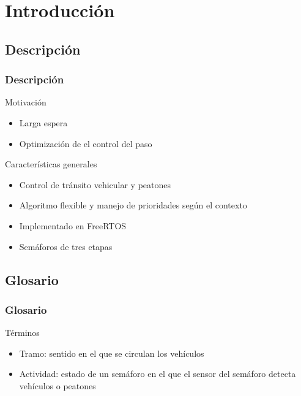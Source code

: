 \section{Introducción} 

\subsection{Descripción}

\begin{frame}
	\frametitle{Descripción}
		\begin{block}{Motivación}
			\begin{itemize}
				\item Larga espera
				\item Optimización de el control del paso
			\end{itemize}
		\end{block}

		\begin{block}{Características generales}
			\begin{itemize}
				\item Control de tránsito vehicular y peatones
				\item Algoritmo flexible y manejo de prioridades según el contexto
				\item Implementado en FreeRTOS
				\item Semáforos de tres etapas
			\end{itemize}
		\end{block}
\end{frame}

\subsection{Glosario}

\begin{frame}
	\frametitle{Glosario}
	\begin{block}{Términos}
		\begin{itemize}
			\item Tramo: sentido en el que se circulan los vehículos
			\item Actividad: estado de un semáforo en el que el sensor del semáforo detecta vehículos o peatones
		\end{itemize}
	\end{block}
\end{frame}

